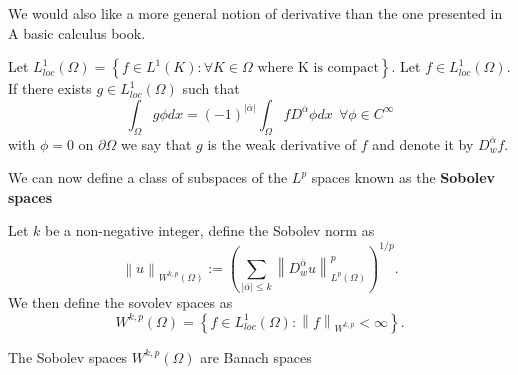 \documentclass[../Main/main.tex]{subfiles}
\begin{document}
	We would also like a more general notion of derivative than the one presented in A basic calculus book.
	\begin{definition}
		Let $L_{loc}^1(\Omega) =\left \{  \right. f\in L^1(K):\forall K \in \Omega \text{  where K is compact}\left.  \right \}$.
		Let $f \in L_{loc}^1(\Omega)$. If there exists $g\in L_{loc}^1 (\Omega)$ such that 
		\begin{equation}
			\int_{\Omega} g \phi dx = (-1)^{|\overline{\alpha}|} \int_{\Omega} f D^{\overline{\alpha}} \phi dx \ \ \forall \phi \in C^{\infty}
		\end{equation}
		 with $\phi = 0$ on $\partial \Omega$  we say that $g$ is the weak derivative of $f$ and denote it by $D_w^{\overline{\alpha}}f$.
	\end{definition}
	
	
	We can now define a class of subspaces of the $L^p$ spaces known as the \textbf{Sobolev spaces}
	\begin{definition}
		Let $k$ be a non-negative integer, define the Sobolev norm as 
		\begin{equation*}
			\left \| u \right \|_{W^{k,p}(\Omega)} := \left (\sum_{|\overline{\alpha}| \leq k} \left \| D_w^{\overline{\alpha}}u \right \|_{L^p(\Omega)}^p\right )^{1/p}.
		\end{equation*}
		We then define the sovolev spaces as 
		\begin{equation*}
			W^{k,p}(\Omega) = \left \{  \right. f\in L^1_{loc}(\Omega):\left \| f \right \|_{W^{k,p}}<\infty \left.  \right \}.
		\end{equation*}
	\end{definition}
	\begin{theorem}
		The Sobolev spaces $W^{k,p}(\Omega)$ are Banach spaces
	\end{theorem}
	
\end{document}
